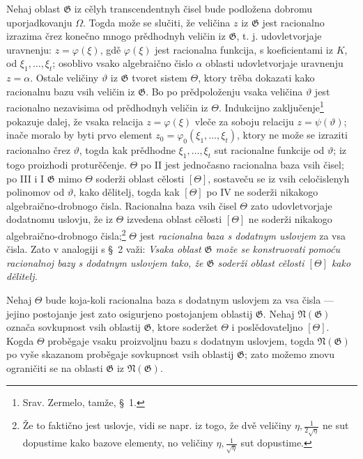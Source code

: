 \documentclass[11pt]{article}
\begin{document}
Nehaj oblast $\mathfrak G$ iz cělyh transcendentnyh čisel bude podložena
dobromu uporjadkovanju $\Omega$. Togda može se slučiti, že veličina $z$ iz
$\mathfrak G$ jest racionalno izrazima črez konečno mnogo prědhodnyh veličin iz
$\mathfrak G$, t. j. udovletvorjaje uravnenju:
$z=\varphi(\xi)$, gdě $\varphi(\xi)$ jest racionalna funkcija, s koeficientami
iz $K$, od $\xi_1,\ldots,\xi_t$; osoblivo vsako algebraično čislo $\alpha$
oblasti udovletvorjaje uravnenju $z=\alpha$. Ostale veličiny $\vartheta$ iz
$\mathfrak G$ tvoret sistem $\Theta$, ktory trěba dokazati kako racionalnu bazu
vsih veličin iz $\mathfrak G$. Bo po prědpoloženju vsaka veličina $\vartheta$
jest racionalno nezavisima od prědhodnyh veličin iz $\Theta$. Indukcijno
zaključenje\footnote{Srav. Zermelo, tamže, \S\ 1.} pokazuje dalej, že vsaka
relacija $z=\varphi(\xi)$ vleče za soboju relaciju $z=\psi(\vartheta)$; inače
moralo by byti prvo element
$z_0=\varphi_0(\xi_1,\ldots,\xi_t)$, ktory ne može se izraziti racionalno črez
$\vartheta$, togda kak prědhodne $\xi_1,\ldots,\xi_t$ sut racionalne funkcije od
$\vartheta$; iz togo proizhodi proturěčenje. $\Theta$ po II jest jednočasno
racionalna baza vsih čisel; po III i I $\mathfrak G$ mimo $\Theta$ soderži
oblast cělosti $[\Theta]$, sostaveču se iz vsih celočislenyh polinomov od
$\vartheta$, kako dělitelj, togda kak $[\Theta]$ po IV ne soderži nikakogo
algebraično-drobnogo čisla. Racionalna baza vsih čisel $\Theta$ zato
udovletvorjaje dodatnomu uslovju, že iz $\Theta$ izvedena oblast cělosti
$[\Theta]$ ne soderži nikakogo algebraično-drobnogo čisla;\footnote{Že to
faktično jest uslovje, vidi se napr. iz togo, že dvě veličiny
$\eta,\frac1{2\sqrt{\eta}}$ ne sut dopustime kako bazove elementy, no veličiny
$\eta,\frac1{\sqrt{\eta}}$ sut dopustime.} $\Theta$ jest {\itshape racionalna
baza s dodatnym uslovjem} za vsa čisla. Zato v analogiji s \S\ 2 važi:
{\itshape Vsaka oblast $\mathfrak G$ može se konstruovati pomoću racionalnoj
bazy s dodatnym uslovjem tako, že $\mathfrak G$ soderži oblast cělosti
$[\Theta]$ kako dělitelj.}

Nehaj $\Theta$ bude koja-koli racionalna baza s dodatnym uslovjem za vsa čisla
--- jejino postojanje jest zato osigurjeno postojanjem oblastij
$\mathfrak G$. Nehaj $\mathfrak N(\mathfrak G)$ označa sovkupnost vsih oblastij
$\mathfrak G$, ktore soderžet $\Theta$ i poslědovateljno $[\Theta]$. Kogda
$\Theta$ proběgaje vsaku proizvoljnu bazu s dodatnym uslovjem, togda
$\mathfrak N(\mathfrak G)$ po vyše skazanom proběgaje sovkupnost vsih oblastij
$\mathfrak G$; zato možemo znovu ograničiti se na oblasti $\mathfrak G$ iz
$\mathfrak N(\mathfrak G)$.
\end{document}
